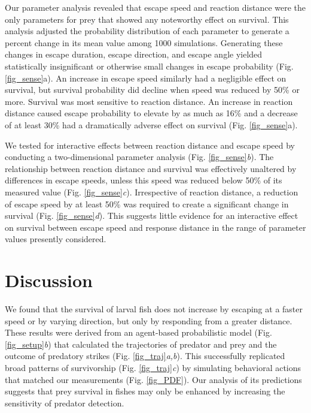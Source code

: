 \documentclass[]{rsos}%
\begin{document}
Our parameter analysis revealed that escape speed and reaction distance were the only parameters for prey that showed any noteworthy effect on survival. 
This analysis adjusted the probability distribution of each parameter to generate a percent change in its mean value among 1000 simulations.
Generating these changes in escape duration, escape direction, and escape angle yielded statistically insignificant or otherwise small changes in escape probability (Fig. \ref{fig_sense}a). 
An increase in escape speed similarly had a negligible effect on survival, but survival probability did decline when speed was reduced by 50\% or more.
Survival was most sensitive to reaction distance.
An increase in reaction distance caused escape probability to elevate by as much as 16\% and a decrease of at least 30\% had a dramatically adverse effect on survival (Fig. \ref{fig_sense}a). 

We tested for interactive effects between reaction distance and escape speed by conducting a two-dimensional parameter analysis (Fig. \ref{fig_sense}\textit{b}).
The relationship between reaction distance and survival was effectively unaltered by differences in escape speeds, unless this speed was reduced below 50\% of its measured value (Fig. \ref{fig_sense}\textit{c}).
Irrespective of reaction distance, a reduction of escape speed by at least 50\% was required to create a significant change in survival (Fig. \ref{fig_sense}\textit{d}).
This suggests little evidence for an interactive effect on survival between escape speed and response distance in the range of parameter values presently considered.


\section{Discussion}%

We found that the survival of larval fish does not increase by escaping at a faster speed or by varying direction, but only by responding from a greater distance.
These results were derived from an agent-based probabilistic model (Fig. \ref{fig_setup}\textit{b}) that calculated the trajectories of predator and prey and the outcome of predatory strikes (Fig. \ref{fig_traj}\textit{a,b}). 
This  successfully replicated broad patterns of survivorship (Fig. \ref{fig_traj}\textit{c}) by simulating behavioral actions that matched our measurements (Fig. \ref{fig_PDF}).
Our analysis of its predictions suggests that prey survival in fishes may only be enhanced by increasing the sensitivity of predator detection.
\end{document}
